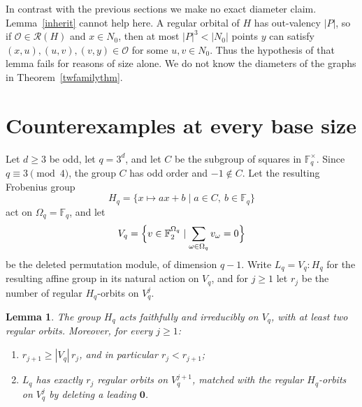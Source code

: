 \documentclass[a4paper,reqno,11pt]{amsart}
\newcommand\F{\mathbb{F}}
\newtheorem{lem}[thm]{Lemma}
\numberwithin{equation}{section}
\begin{document}
In contrast with the previous sections we make no exact diameter claim. Lemma~\ref{inherit} cannot help here. A regular orbital of $H$ has out-valency $|P|$, so if $\mathcal O\in\mathcal R(H)$ and $x\in N_0$, then at most $|P|^3<|N_0|$ points $y$ can satisfy $(x,u),(u,v),(v,y)\in\mathcal O$ for some $u,v\in N_0$. Thus the hypothesis of that lemma fails for reasons of size alone. We do not know the diameters of the graphs in Theorem~\ref{twfamilythm}.


\section{Counterexamples at every base size} \label{sec:everybase}

Let $d\ge3$ be odd, let $q=3^d$, and let $C$ be the subgroup of squares in $\F_q^\times$. Since $q\equiv3\pmod4$, the group $C$ has odd order and $-1\notin C$. Let the resulting Frobenius group
\[
H_q=\{x\mapsto ax+b \mid a\in C,\ b\in\F_q\}
\]
act on $\Omega_q=\F_q$, and let
\[
V_q=\Bigl\{v\in\F_2^{\Omega_q} \mid \sum_{\omega\in\Omega_q}v_\omega=0\Bigr\}
\]
be the deleted permutation module, of dimension $q-1$. Write $L_q=V_q{:}H_q$ for the resulting affine group in its natural action on $V_q$, and for $j\ge1$ let $r_j$ be the number of regular $H_q$-orbits on $V_q^j$.

\begin{lem}\label{genmodule}
The group $H_q$ acts faithfully and irreducibly on $V_q$, with at least two regular orbits. Moreover, for every $j\ge1$:
\begin{enumerate}
\item[{(i)}] $r_{j+1}\ge|V_q|\,r_j$, and in particular $r_j<r_{j+1}$;
\item[{(ii)}] $L_q$ has exactly $r_j$ regular orbits on $V_q^{j+1}$, matched with the regular $H_q$-orbits on $V_q^{j}$ by deleting a leading $\mathbf0$.
\end{enumerate}
\end{lem}
\end{document}
